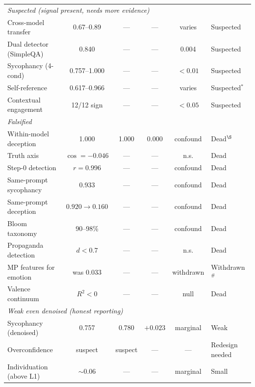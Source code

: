 \documentclass[11pt,a4paper]{article}
\begin{document}
\begin{table}[h!]
\begin{tabular}{p{3.5cm}ccccl}
\midrule
\multicolumn{6}{l}{\textit{Suspected (signal present, needs more evidence)}} \\
Cross-model transfer & 0.67--0.89 & --- & --- & varies & Suspected \\
Dual detector (SimpleQA) & 0.840 & --- & --- & 0.004 & Suspected \\
Sycophancy (4-cond) & 0.757--1.000 & --- & --- & $<0.01$ & Suspected \\
Self-reference & 0.617--0.966 & --- & --- & varies & Suspected$^*$ \\
Contextual engagement & 12/12 sign & --- & --- & $<0.05$ & Suspected \\
\midrule
\multicolumn{6}{l}{\textit{Falsified}} \\
Within-model deception & 1.000 & 1.000 & 0.000 & confound & Dead$^\S$ \\
Truth axis & $\cos=-0.046$ & --- & --- & n.s. & Dead \\
Step-0 detection & $r=0.996$ & --- & --- & confound & Dead \\
Same-prompt sycophancy & 0.933 & --- & --- & confound & Dead \\
Same-prompt deception & $0.920\to0.160$ & --- & --- & confound & Dead \\
Bloom taxonomy & 90--98\% & --- & --- & confound & Dead \\
Propaganda detection & $d<0.7$ & --- & --- & n.s. & Dead \\
MP features for emotion & was 0.033 & --- & --- & withdrawn & Withdrawn$^{\#}$ \\
Valence continuum & $R^2<0$ & --- & --- & null & Dead \\
\midrule
\multicolumn{6}{l}{\textit{Weak even denoised (honest reporting)}} \\
Sycophancy (denoised) & 0.757 & 0.780 & $+0.023$ & marginal & Weak \\
Overconfidence & suspect & suspect & --- & --- & Redesign needed \\
Individuation (above L1) & $\sim$0.06 & --- & --- & marginal & Small \\
\bottomrule
\end{tabular}
\end{table}
\end{document}
